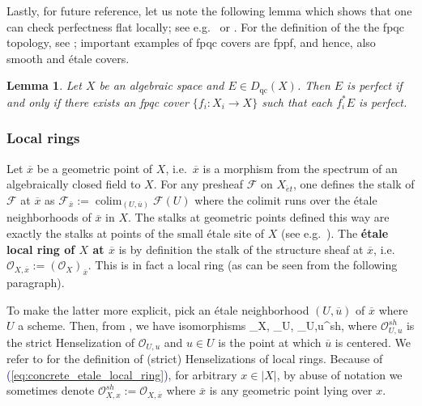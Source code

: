 \documentclass[11pt]{amsart}
\def\eqref#1{\textcolor{darkblue}{(\ref{#1})}}
\let\oldequation\equation
\let\oldendequation\endequation
\renewenvironment{equation}{\linenomathNonumbers\oldequation}{\oldendequation\endlinenomath}
\theoremstyle{plain}
\newtheorem{lemma}[theorem]{Lemma}
\theoremstyle{definition}
\numberwithin{equation}{section}
\numberwithin{theorem}{section}
\begin{document}
Lastly, for future reference, let us note the following lemma which shows that one can check perfectness flat locally; see e.g.\ \cite[Lemma 4.1]{Hall/Rydh:2017} or \cite[Lemma 2.2]{DeDeyn/Lank/ManaliRahul/Peng:2025}.
For the definition of the the fpqc topology, see \cite[\href{https://stacks.math.columbia.edu/tag/03MP}{Tag 03MP}]{StacksProject}; important examples of fpqc covers are fppf, and hence, also smooth and \'{e}tale covers.

\begin{lemma}
    \label{lem:perfect_flat_local}
    Let $X$ be an algebraic space and $E\in D_{\operatorname{qc}}(X)$.
    Then $E$ is perfect if and only if there exists an fpqc cover $\{ f_i\colon X_i\to X\}$ such that each $f^\ast_i E$ is perfect.
\end{lemma}

\subsubsection{Local rings}
\label{sec:prelim_spaces_local_rings}

Let $\overline{x}$ be a geometric point of $X$, i.e.\ $\overline{x}$ is a morphism from the spectrum of an algebraically closed field to $X$. 
For any presheaf $\mathcal{F}$ on $X_{\acute{e}t}$, one defines the stalk of $\mathcal{F}$ at $\overline{x}$ as $\mathcal{F}_{\bar x} := \mathop{\mathrm{colim}}\nolimits _{(U, \overline{u})} \mathcal{F}(U)$ where the colimit runs over the \'{e}tale neighborhoods of $\overline{x}$ in $X$.
The stalks at geometric points defined this way are exactly the stalks at points of the small \'{e}tale site of $X$ (see e.g.\ \cite[\href{https://stacks.math.columbia.edu/tag/04K6}{Tag 04K6}]{StacksProject}). 
The \textbf{\'{e}tale local ring of $X$ at $\overline{x}$} is by definition the stalk of the structure sheaf at $\overline{x}$, i.e.\ $\mathcal{O}_{X,\overline{x}}:=(\mathcal{O}_X)_{\overline{x}}$. 
This is in fact a local ring (as can be seen from the following paragraph).

To make the latter more explicit, pick an \'{e}tale neighborhood $(U,\overline{u})$ of $\overline{x}$ where $U$ a scheme. 
Then, from \cite[\href{https://stacks.math.columbia.edu/tag/04KF}{Tag 04KF}]{StacksProject}, we have isomorphisms
\begin{equation}\label{eq:concrete_etale_local_ring}
    _{X,} \cong {}_{U,} \cong {}_{U,u}^{sh},
\end{equation}
where $\mathcal{O}_{U,u}^{sh}$ is the strict Henselization of $\mathcal{O}_{U,u}$ and $u\in U$ is the point at which $\overline{u}$ is centered.
We refer to \cite[\href{https://stacks.math.columbia.edu/tag/0BSK}{Tag 0BSK}]{StacksProject} for the definition of (strict) Henselizations of local rings.
Because of \eqref{eq:concrete_etale_local_ring}, for arbitrary $x\in |X|$, by abuse of notation we sometimes denote $\mathcal{O}_{X,x}^{sh}:=\mathcal{O}_{X,\overline{x}}$ where $\overline{x}$ is any geometric point lying over $x$.
\end{document}

